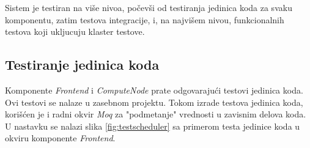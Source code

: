 \documentclass[12pt,oneside]{memoir}
\begin{document}


Sistem je testiran na više nivoa, počevši od testiranja jedinica koda za svaku komponentu, zatim testova integracije, i, na najvišem nivou, funkcionalnih testova koji ukljucuju klaster testove.

\subsection{Testiranje jedinica koda}
Komponente \emph{Frontend} i \emph{ComputeNode} prate odgovarajući testovi jedinica koda. Ovi testovi se nalaze u zasebnom projektu. Tokom izrade testova jedinica koda, korišćen je i radni okvir \emph{Moq} \cite{Moq} za "podmetanje" vrednosti u zavisnim delova koda. U nastavku se nalazi slika \ref{fig:testscheduler} sa primerom testa jedinice koda u okviru komponente \emph{Frontend}.
\end{document}
